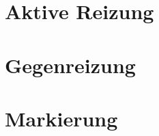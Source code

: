 \maketitle

\tableofcontents

\newpage
\part{Aktive Reizung}


\newpage
\part{Gegenreizung}


\newpage
\part{Markierung}
